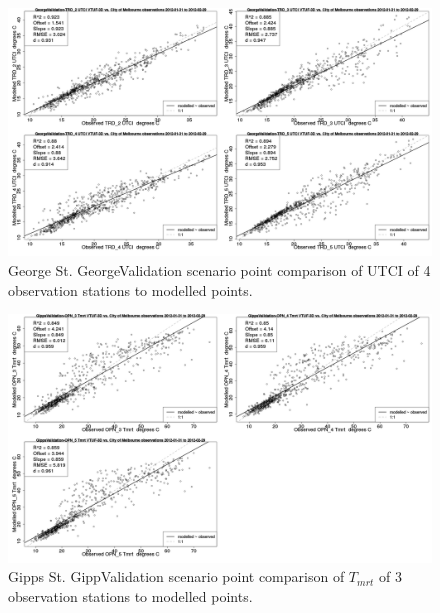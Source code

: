 \documentclass[final,3p,times,authoryear]{elsarticle}
\begin{document}
\begin{figure}[!htbp]
\includegraphics[trim = 0mm 0mm 0mm 0mm, clip, scale=0.30]{images/GeorgeValidation-ErrorPlots-UTCI5.png}
\caption{George St. GeorgeValidation scenario point comparison of UTCI of 4 observation stations to modelled points.\label{fig:GeorgeStUtciCompare}} 
\end{figure}

\begin{figure}[!htbp]
\includegraphics[trim = 0mm 0mm 0mm 0mm, clip, scale=0.30]{images/GippsValidation-ErrorPlots-Tmrt5.png}
\caption{Gipps St. GippValidation scenario point comparison of $T_{mrt}$ of 3 observation stations to modelled points.\label{fig:GippsStTmrtCompare}} 
\end{figure}
\end{document}
